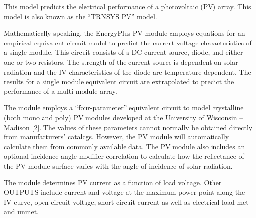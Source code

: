 This model predicts the electrical performance of a photovoltaic (PV) array. This model is also known as the ``TRNSYS PV'' model.

Mathematically speaking, the EnergyPlus PV module employs equations for an empirical equivalent circuit model to predict the current-voltage characteristics of a single module. This circuit consists of a DC current source, diode, and either one or two resistors. The strength of the current source is dependent on solar radiation and the IV characteristics of the diode are temperature-dependent. The results for a single module equivalent circuit are extrapolated to predict the performance of a multi-module array.

The module employs a ``four-parameter'' equivalent circuit to model crystalline (both mono and poly) PV modules developed at the University of Wisconsin -- Madison {[}2{]}. The values of these parameters cannot normally be obtained directly from manufacturers' catalogs. However, the PV module will automatically calculate them from commonly available data. The PV module also includes an optional incidence angle modifier correlation to calculate how the reflectance of the PV module surface varies with the angle of incidence of solar radiation.

The module determines PV current as a function of load voltage. Other OUTPUTS include current and voltage at the maximum power point along the IV curve, open-circuit voltage, short circuit current as well as electrical load met and unmet.

